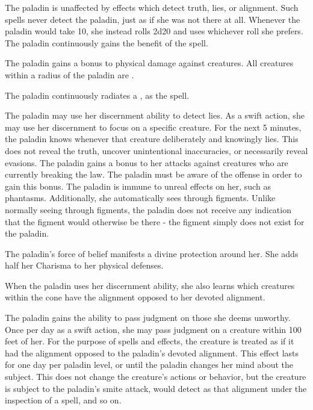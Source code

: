  The paladin is unaffected by effects which detect truth, lies, or alignment. Such spells never detect the paladin, just as if she was not there at all.
 Whenever the paladin would take 10, she instead rolls 2d20 and uses whichever roll she prefers.
 The paladin continuously gains the benefit of the  spell.

 The paladin gains a  bonus to physical damage against \bloodied creatures.
 All creatures within a \areamed radius of the paladin are \vulnerable.

 The paladin continuously radiates a , as the spell.

 The paladin may use her discernment ability to detect lies. As a swift action, she may use her discernment to focus on a specific creature. For the next 5 minutes, the paladin knows whenever that creature deliberately and knowingly lies. This does not reveal the truth, uncover unintentional inaccuracies, or necessarily reveal evasions.
 The paladin gains a  bonus to her attacks against creatures who are currently breaking the law. The paladin must be aware of the offense in order to gain this bonus.
 The paladin is immune to unreal effects on her, such as phantasms. Additionally, she automatically sees through figments. Unlike normally seeing through figments, the paladin does not receive any indication that the figment would otherwise be there - the figment simply does not exist for the paladin.

 The paladin's force of belief manifests a divine protection around her. She adds half her Charisma to her physical defenses.

 When the paladin uses her discernment ability, she also learns which creatures within the cone have the alignment opposed to her devoted alignment.

 The paladin gains the ability to pass judgment on those she deems unworthy. Once per day as a swift action, she may pass judgment on a creature within 100 feet of her. For the purpose of spells and effects, the creature is treated as if it had the alignment opposed to the paladin's devoted alignment. This effect lasts for one day per paladin level, or until the paladin changes her mind about the subject. This does not change the creature's actions or behavior, but the creature is subject to the paladin's smite attack, would detect as that alignment under the inspection of a  spell, and so on.

